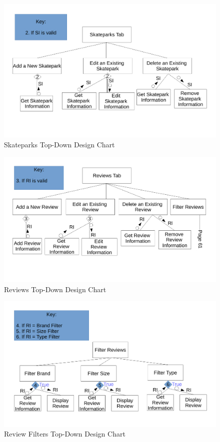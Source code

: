 \begin{figure}[H]
    \includegraphics[width=\textwidth]{./design/HDiagrams/Skateparks.pdf}
    \caption{Skateparks Top-Down Design Chart} \label{fig:Skateparks}
\end{figure}

\begin{figure}[H]
    \includegraphics[width=\textwidth]{./design/HDiagrams/Reviews.pdf}
    \caption{Reviews Top-Down Design Chart} \label{fig:Reviews}
\end{figure}

\begin{figure}[H]
    \includegraphics[width=\textwidth]{./design/HDiagrams/ReviewFilters.pdf}
    \caption{Review Filters Top-Down Design Chart} \label{fig:Filters}
\end{figure}

